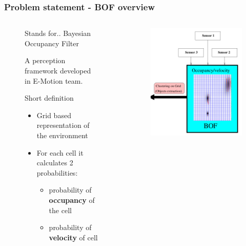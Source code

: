 \documentclass{beamer}
\begin{document}
	\begin{frame}
		\frametitle{Problem statement - BOF overview}
	
		  \begin{columns}[t]
		  \begin{column}{5cm}
			\begin{figure}[h]
			\center
	
		\begin{block}{Stands for..}
			Bayesian Occupancy Filter
			
			A perception framework developed in E-Motion team.  \cite{coue2003}
		\end{block}
	
			\begin{block}{Short definition}
			\begin{itemize}		
				 \item Grid based representation of the environment
				 \item For each cell it calculates 2 probabilities:
			 		\begin{itemize}		
				 		\item probability of \textbf{occupancy} of the cell
				 		\item probability of \textbf{velocity} of cell
	 				\end{itemize}		
				 
			\end{itemize}				
			\end{block}
		\end{figure}	
		  \end{column}
		  
		  \begin{column}{5cm}
			\begin{figure}[h]
			\center
			\includegraphics[scale=0.3]{img/bof}
		\end{figure}	
		  \end{column}
		 \end{columns}		
		
		
		
	\end{frame}
\end{document}
